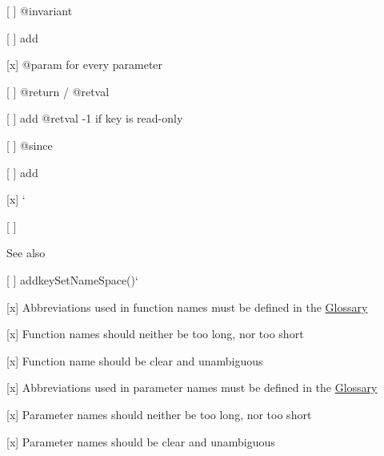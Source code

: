 \begin{DoxyItemize}
\begin{DoxyItemize}
\end{DoxyItemize}
\item \mbox{[} \mbox{]} {\ttfamily @invariant}
\begin{DoxyItemize}
\item \mbox{[} \mbox{]} add
\end{DoxyItemize}
\item \mbox{[}x\mbox{]} {\ttfamily @param} for every parameter
\item \mbox{[} \mbox{]} {\ttfamily @return} / {\ttfamily @retval}
\begin{DoxyItemize}
\item \mbox{[} \mbox{]} add {\ttfamily @retval} -\/1 if key is read-\/only
\end{DoxyItemize}
\item \mbox{[} \mbox{]} {\ttfamily @since}
\begin{DoxyItemize}
\item \mbox{[} \mbox{]} add
\end{DoxyItemize}
\item \mbox{[}x\mbox{]} `{\ttfamily }
\item {\ttfamily \mbox{[} \mbox{]}}\begin{DoxySeeAlso}{See also}
{\ttfamily 
\begin{DoxyItemize}
\item \mbox{[} \mbox{]} addkey\+Set\+Name\+Space()`
\end{DoxyItemize}}
\end{DoxySeeAlso}

\end{DoxyItemize}

{\ttfamily 
\begin{DoxyItemize}
\item \mbox{[}x\mbox{]} Abbreviations used in function names must be defined in the \hyperlink{doc_help_elektra-glossary_md}{Glossary}
\item \mbox{[}x\mbox{]} Function names should neither be too long, nor too short
\item \mbox{[}x\mbox{]} Function name should be clear and unambiguous
\item \mbox{[}x\mbox{]} Abbreviations used in parameter names must be defined in the \hyperlink{doc_help_elektra-glossary_md}{Glossary}
\item \mbox{[}x\mbox{]} Parameter names should neither be too long, nor too short
\item \mbox{[}x\mbox{]} Parameter names should be clear and unambiguous
\end{DoxyItemize}}

